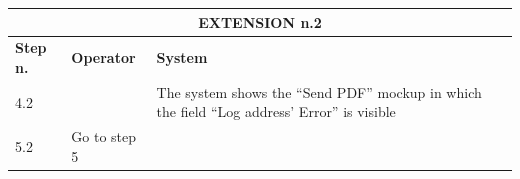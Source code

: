 {{{\begin{center}
			\begin{tabular}{|p{2cm}|p{6cm}|p{6cm}|}
			\hline
				\multicolumn{3}{|c|}{EXTENSION n.2}\\
			\hline
				\centering \vspace{1mm} \bfseries{Step n.} \vspace{1mm} & \vspace{1mm} \bfseries{Operator} \vspace{1mm} & \vspace{1mm} \bfseries{System} \vspace{1mm}\\
			\hline
				\vspace{1mm} 4.2 \vspace{1mm} &
				\vspace{1mm} \vspace{1mm} & 
				\vspace{1mm} The system shows the “Send PDF” mockup in which the field “Log address’ Error” is visible\vspace{1mm} \\
			\hline
				\vspace{1mm} 5.2 \vspace{1mm} &
				\vspace{1mm} Go to step 5\vspace{1mm} & 
				\vspace{1mm} \vspace{1mm} \\
			\hline
			\end{tabular}


\end{center}}}}

